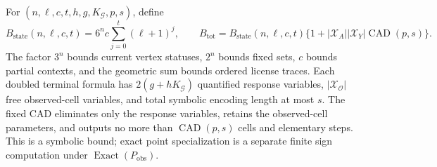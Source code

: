 For \((n,\ell,c,t,h,g,K_{\mathcal G},p,s)\), define \[B_{\mathrm{state}}(n,\ell,c,t)=6^n c\sum_{j=0}^{t}(\ell+1)^j,\qquad B_{\mathrm{tot}}=B_{\mathrm{state}}(n,\ell,c,t)\{1+|\mathcal X_A||\mathcal X_Y|\operatorname{CAD}(p,s)\}.\] The factor \(3^n\) bounds current vertex statuses, \(2^n\) bounds fixed sets, \(c\) bounds partial contexts, and the geometric sum bounds ordered license traces. Each doubled terminal formula has \(2(g+hK_{\mathcal G})\) quantified response variables, \(|\mathcal X_{\mathcal O}|\) free observed-cell variables, and total symbolic encoding length at most \(s\). The fixed CAD eliminates only the response variables, retains the observed-cell parameters, and outputs no more than \(\operatorname{CAD}(p,s)\) cells and elementary steps. This is a symbolic bound; exact point specialization is a separate finite sign computation under \(\operatorname{Exact}(P_{\mathrm{obs}})\).